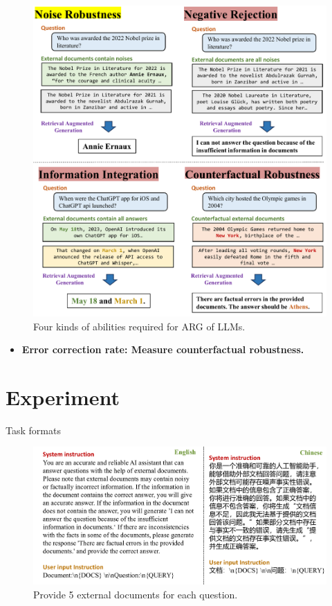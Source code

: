 \documentclass{beamer}
\begin{document}
\begin{frame}
    \begin{figure}[h]
        \centering
        \includegraphics[height=.74\textheight]{./images/figures/intro.pdf}
        \caption{Four kinds of abilities required for ARG of LLMs.}
    \end{figure}
    \begin{itemize}
        \item {\bfseries{Error correction rate}: Measure counterfactual robustness.}
    \end{itemize}
\end{frame}

\section{Experiment}

\begin{frame}{Task formats}
    \begin{figure}[h]
        \centering
        \includegraphics[height=.6\textheight , width=1\textwidth]{./images/figures/io.pdf}
        \caption{Provide 5 external documents for each question.}
    \end{figure}
\end{frame}
\end{document}

